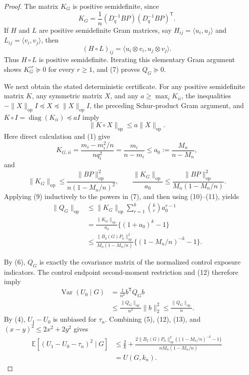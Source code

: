 \documentclass{article}
\begin{document}
\begin{proof}
The matrix \(K_G\) is positive semidefinite, since
\[
K_G=\frac1n(D_q^{-1}BP)(D_q^{-1}BP)^{\mathsf T}.
\tag{8}
\]
If \(H\) and \(L\) are positive semidefinite Gram matrices, say
\(H_{ij}=\langle u_i,u_j\rangle\) and
\(L_{ij}=\langle v_i,v_j\rangle\), then
\[
(H\circ L)_{ij}
=\langle u_i\otimes v_i,u_j\otimes v_j\rangle.
\]
Thus \(H\circ L\) is positive semidefinite.  Iterating this elementary
Gram argument shows \(K_G^{\circ r}\succeq0\) for every \(r\ge1\), and
(7) proves \(Q_G\succeq0\).

We next obtain the stated deterministic certificate.  For any positive
semidefinite matrix \(K\), any symmetric matrix \(X\), and any
\(a\ge\max_iK_{ii}\), the inequalities
\(-\|X\|_{\mathrm{op}}I\preceq X\preceq\|X\|_{\mathrm{op}}I\), the
preceding Schur-product Gram argument, and
\(K\circ I=\operatorname{diag}(K_{ii})\preceq aI\) imply
\[
\|K\circ X\|_{\mathrm{op}}
\le a\|X\|_{\mathrm{op}}.
\tag{9}
\]
Here direct calculation and (1) give
\[
K_{G,ii}
=\frac{m_i-m_i^2/n}{nq_i^2}
=\frac{m_i}{n-m_i}
\le a_0:=\frac{M_n}{n-M_n},
\tag{10}
\]
and
\[
\|K_G\|_{\mathrm{op}}
\le\frac{\|BP\|_{\mathrm{op}}^2}
{n(1-M_n/n)^2},
\qquad
\frac{\|K_G\|_{\mathrm{op}}}{a_0}
\le\frac{\|BP\|_{\mathrm{op}}^2}
{M_n(1-M_n/n)}.
\tag{11}
\]
Applying (9) inductively to the powers in (7), and then using (10)--(11),
yields
\[
\begin{aligned}
\|Q_G\|_{\mathrm{op}}
&\le \|K_G\|_{\mathrm{op}}
\sum_{r=1}^{k}\binom{k}{r}a_0^{r-1}\\
&=\frac{\|K_G\|_{\mathrm{op}}}{a_0}
\{(1+a_0)^k-1\}\\
&\le
\frac{\|B_2(G)P_n\|_{\mathrm{op}}^2}
{M_n(1-M_n/n)}
\{(1-M_n/n)^{-k}-1\}.
\end{aligned}
\tag{12}
\]

By (6), \(Q_G\) is exactly the covariance matrix of the normalized control
exposure indicators.  The control endpoint second-moment restriction and
(12) therefore imply
\[
\begin{aligned}
\operatorname{Var}(U_0\mid G)
&=\frac1{n^2}b^{\mathsf T}Q_Gb\\
&\le\frac{\|Q_G\|_{\mathrm{op}}}{n^2}\|b\|_2^2
\le\frac{\|Q_G\|_{\mathrm{op}}}{n}.
\end{aligned}
\tag{13}
\]
By (4), \(U_1-U_0\) is unbiased for \(\tau_n\).  Combining (5), (12),
(13), and \((x-y)^2\le2x^2+2y^2\) gives
\[
\begin{aligned}
\mathbb E[(U_1-U_0-\tau_n)^2\mid G]
&\le \frac2k+
\frac{2\|B_2(G)P_n\|_{\mathrm{op}}^2
\{(1-M_n/n)^{-k}-1\}}
{nM_n(1-M_n/n)}\\
&=U(G,k_n).
\end{aligned}
\tag{14}
\]


\end{proof}
\end{document}
